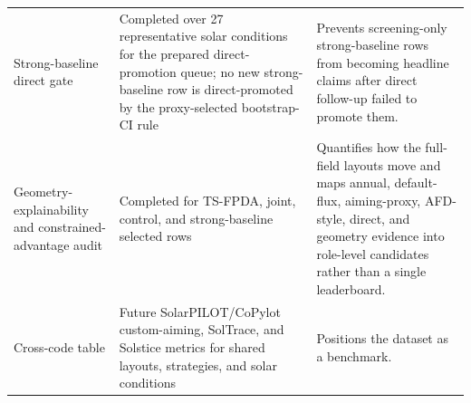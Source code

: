 \documentclass[final,3p,times]{elsarticle}
\begin{document}
\begin{longtable}{p{}p{}p{}}
Strong-baseline direct gate & Completed over 27 representative solar conditions for the prepared direct-promotion queue; no new strong-baseline row is direct-promoted by the proxy-selected bootstrap-CI rule & Prevents screening-only strong-baseline rows from becoming headline claims after direct follow-up failed to promote them. \\
Geometry-explainability and constrained-advantage audit & Completed for TS-FPDA, joint, control, and strong-baseline selected rows & Quantifies how the full-field layouts move and maps annual, default-flux, aiming-proxy, AFD-style, direct, and geometry evidence into role-level candidates rather than a single leaderboard. \\
Cross-code table & Future SolarPILOT/CoPylot custom-aiming, SolTrace, and Solstice metrics for shared layouts, strategies, and solar conditions & Positions the dataset as a benchmark. \\
\bottomrule
\end{longtable}

\fi

\end{document}
